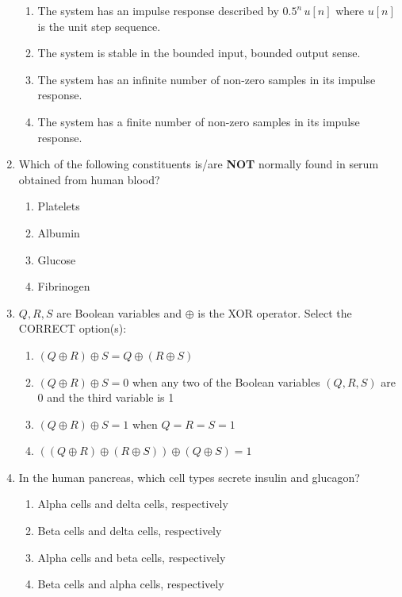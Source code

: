 \documentclass[journal]{IEEEtran}
\begin{document}
\begin{enumerate}
\begin{enumerate}
    \item The system has an impulse response described by \( 0.5^n \, u[n] \) where \( u[n] \) is the unit step sequence.
    \item The system is stable in the bounded input, bounded output sense.
    \item The system has an infinite number of non-zero samples in its impulse response.
    \item The system has a finite number of non-zero samples in its impulse response.
\end{enumerate}
\hfill{}

\item  Which of the following constituents is/are \textbf{NOT} normally found in serum obtained from human blood?

\begin{enumerate}
    \item Platelets
    \item Albumin
    \item Glucose
    \item Fibrinogen
\end{enumerate}
\hfill{}

\item  \( Q, R, S \) are Boolean variables and \( \oplus \) is the XOR operator. Select the CORRECT option(s):

\begin{enumerate}
    \item \( (Q \oplus R) \oplus S = Q \oplus (R \oplus S) \)
    \item \( (Q \oplus R) \oplus S = 0 \) when any two of the Boolean variables \( (Q, R, S) \) are 0 and the third variable is 1
    \item \( (Q \oplus R) \oplus S = 1 \) when \( Q = R = S = 1 \)
    \item \( ((Q \oplus R) \oplus (R \oplus S)) \oplus (Q \oplus S) = 1 \)
\end{enumerate}
\hfill{}

\item  In the human pancreas, which cell types secrete insulin and glucagon?

\begin{enumerate}
    \item Alpha cells and delta cells, respectively
    \item Beta cells and delta cells, respectively
    \item Alpha cells and beta cells, respectively
    \item Beta cells and alpha cells, respectively
\end{enumerate}
\hfill{}


\end{enumerate}
\end{document}
